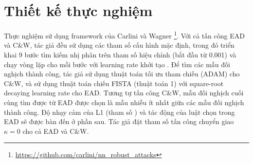 \section{Thiết kế thực nghiệm}
Thực nghiệm sử dụng framework của Carlini và Wagner \footnote{\href{https://github.com/carlini/nn_robust_attacks}{https://github.com/carlini/nn\_robust\_attacks}}. Với cả tấn công EAD và C\&W, tác giả đều sử dụng các tham số cấu hình mặc định, trong đó triển khai 9 bước tìm kiếm nhị phân trên tham số hiệu chỉnh  (bắt đầu từ 0.001) và chạy  vòng lặp cho mỗi bước với learning rate khởi tạo . Để tìm các mẫu đối nghịch thành công, tác giả sử dụng thuật toán tối ưu tham chiếu (ADAM) cho C\&W, và sử dụng thuật toán chiếu FISTA (thuật toán 1) với square-root decaying learning rate cho EAD. Tương tự tấn công C\&W, mẫu đối nghịch cuối cùng tìm được từ EAD được chọn là mẫu nhiễu ít nhất giữa các mẫu đối nghịch thành công. Độ nhạy cảm của L1 (tham số  ) và tác động của luật chọn trong EAD sẽ được bàn đến ở phần sau. Tác giả đặt tham số tấn công chuyển giao $\kappa = 0$ cho cả EAD và C\&W.

